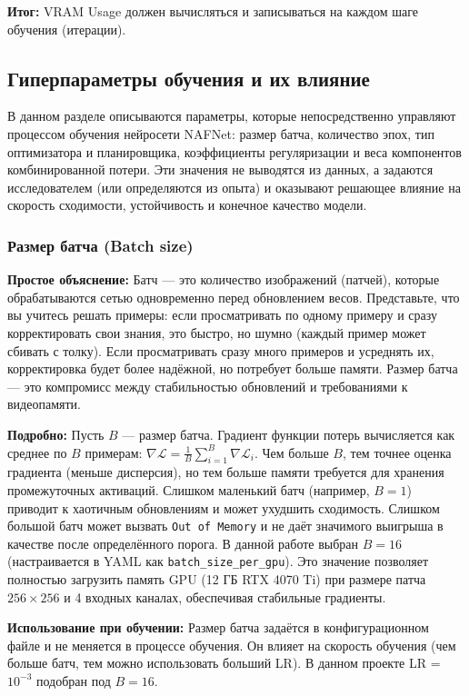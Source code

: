\documentclass[12pt,a4paper]{article}
\begin{document}
\textbf{Итог:} VRAM Usage должен вычисляться и записываться на каждом шаге обучения (итерации).

\subsection{Гиперпараметры обучения и их влияние}

В данном разделе описываются параметры, которые непосредственно управляют процессом обучения нейросети NAFNet: размер батча, количество эпох, тип оптимизатора и планировщика, коэффициенты регуляризации и веса компонентов комбинированной потери. Эти значения не выводятся из данных, а задаются исследователем (или определяются из опыта) и оказывают решающее влияние на скорость сходимости, устойчивость и конечное качество модели.

\subsubsection{Размер батча (Batch size)}

\textbf{Простое объяснение:}  
Батч — это количество изображений (патчей), которые обрабатываются сетью одновременно перед обновлением весов. Представьте, что вы учитесь решать примеры: если просматривать по одному примеру и сразу корректировать свои знания, это быстро, но шумно (каждый пример может сбивать с толку). Если просматривать сразу много примеров и усреднять их, корректировка будет более надёжной, но потребует больше памяти. Размер батча — это компромисс между стабильностью обновлений и требованиями к видеопамяти.

\textbf{Подробно:}  
Пусть \(B\) — размер батча. Градиент функции потерь вычисляется как среднее по \(B\) примерам: \(\nabla \mathcal{L} = \frac{1}{B}\sum_{i=1}^{B} \nabla \mathcal{L}_i\). Чем больше \(B\), тем точнее оценка градиента (меньше дисперсия), но тем больше памяти требуется для хранения промежуточных активаций. Слишком маленький батч (например, \(B=1\)) приводит к хаотичным обновлениям и может ухудшить сходимость. Слишком большой батч может вызвать \texttt{Out of Memory} и не даёт значимого выигрыша в качестве после определённого порога. В данной работе выбран \(B = 16\) (настраивается в YAML как \texttt{batch\_size\_per\_gpu}). Это значение позволяет полностью загрузить память GPU (12 ГБ RTX 4070 Ti) при размере патча \(256\times256\) и 4 входных каналах, обеспечивая стабильные градиенты.

\textbf{Использование при обучении:}  
Размер батча задаётся в конфигурационном файле и не меняется в процессе обучения. Он влияет на скорость обучения (чем больше батч, тем можно использовать больший LR). В данном проекте LR = \(10^{-3}\) подобран под \(B=16\).
\end{document}
